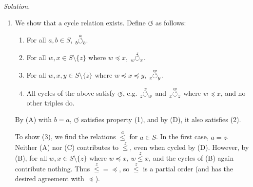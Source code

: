\documentclass{article}
\newcommand{\ternary}[4]{\hspace{-1mm}\tensor[_{#3}]{\overset{#2}{#1}}{_{#4}}}
\newcommand{\cyc}[3]{\ternary{\circlearrowleft}{#1}{#2}{#3}}
\newcommand{\po}[1]{\overset{#1}{\leq}}
\begin{document}
\textit{Solution.}
\begin{enumerate}[label=(\roman*)]
\item
  We show that a cycle relation exists.
  Define $\circlearrowleft$ as follows:
  \begin{enumerate}[label=(\Alph*)]
  \item
    For all $a, b \in S$,
    $\cyc{a}{b}{b}$.
  \item
    For all $w, x \in S \setminus \{z\}$
    where $w \preceq x$, $\cyc{z}{w}{x}$.
  \item
    For all $w, x, y \in S \setminus \{z\}$
    where $w \preceq x \preceq y$, $\cyc{w}{x}{y}$.
  \item
    All cycles of the above satisfy $\circlearrowleft$,
    e.g. $\cyc{x}{z}{w}$ and $\cyc{w}{x}{z}$ where $w \preceq x$,
    and no other triples do.
  \end{enumerate}
  By (A) with $b = a$, $\circlearrowleft$ satisfies property (1),
  and by (D), it also satisfies (2).

  To show (3), we find the relations $\po{a}$ for $a \in S$.
  In the first case, $a = z$.
  Neither (A) nor (C) contributes to $\po{z}$,
  even when cycled by (D).
  However, by (B), for all $w, x \in S \setminus \{z\}$
  where $w \preceq x$, $w \po{z} x$,
  and the cycles of (B) again contribute nothing.
  Thus $\po{z} = \preceq$, so $\po{z}$ is a partial order
  (and has the desired agreement with $\preceq$).


\end{enumerate}
\end{document}
